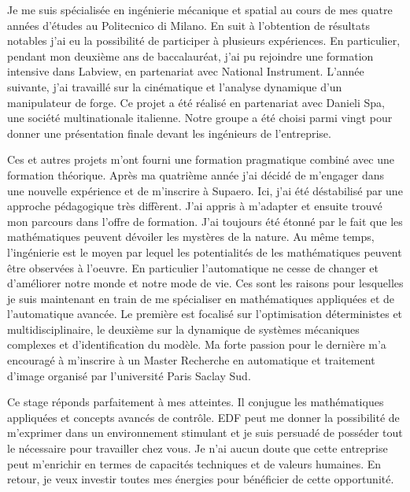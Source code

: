 \documentclass[11pt]{letter}
\begin{document}
Je me suis spécialisée en ingénierie mécanique et spatial au cours de mes quatre années d'études au Politecnico di Milano. En suit à l'obtention de résultats notables j'ai eu la possibilité de participer à plusieurs expériences. En particulier, pendant mon deuxième ans de baccalauréat, j'ai pu rejoindre une formation intensive dans Labview, en partenariat avec National Instrument. L'année suivante, j'ai travaillé sur la cinématique et l'analyse dynamique d'un manipulateur de forge. Ce projet a été réalisé en partenariat avec Danieli Spa, une société multinationale italienne. Notre groupe a été choisi parmi vingt pour donner une présentation finale devant les ingénieurs de l'entreprise. 
\begin{comment}
J'ai spécialement apprécié de travailler sur un projet de transfert interplanétaire. Dans des missions spatiales complexes différentes disciplines doivent être intégrées et c'est la raison pour la quelle j'ai travaillé passionnément au projet. Plus tard, j'ai eu l'occasion de travailler sur la dynamique multi-corps dans l'environnement Simulink pour étudier les flexibilités des appendices au cours de manoeuvres de satellites.
\end{comment}
 Ces et autres projets m'ont fourni une formation pragmatique combiné avec une formation théorique. Après ma quatrième année j'ai décidé de m'engager dans une nouvelle expérience et de m'inscrire à Supaero. Ici, j'ai été déstabilisé par une approche pédagogique très diffèrent. J'ai appris à m'adapter et ensuite trouvé mon parcours dans l'offre de formation. J'ai toujours été étonné par le fait que les mathématiques peuvent dévoiler les mystères de la nature. Au même temps, l'ingénierie est le moyen par lequel les potentialités de les mathématiques peuvent être observées à l'oeuvre. En particulier l'automatique ne cesse de changer et d'améliorer notre monde et notre mode de vie. Ces sont les raisons pour lesquelles je suis maintenant en train de me spécialiser en mathématiques appliquées et de l'automatique avancée. Le première est focalisé sur l'optimisation déterministes et multidisciplinaire, le deuxième sur la dynamique de systèmes mécaniques complexes et d'identification du modèle. Ma forte passion pour le dernière m'a encouragé à m'inscrire à un Master Recherche en automatique et traitement d'image organisé par l'université Paris Saclay Sud. %

Ce stage réponds parfaitement à mes atteintes. Il conjugue les mathématiques appliquées et concepts avancés de contrôle. EDF peut me donner la possibilité de m'exprimer dans un environnement stimulant et je suis persuadé de posséder tout le nécessaire pour travailler chez vous. Je n'ai aucun doute que cette entreprise peut m'enrichir en termes de capacités techniques et de valeurs humaines. En retour, je veux investir toutes mes énergies pour bénéficier de cette opportunité.
\end{document}
